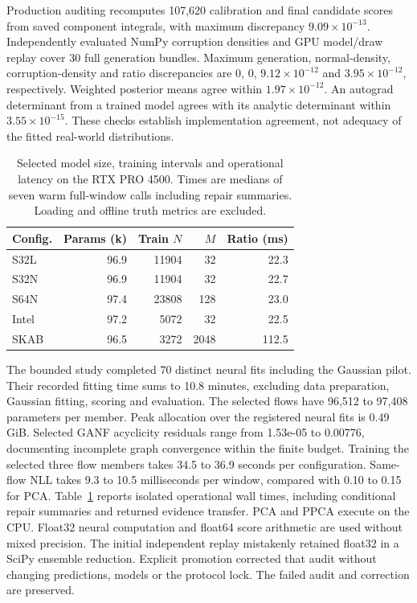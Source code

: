 \documentclass[conference]{IEEEtran}
\newcommand{\1}{\mathbf{1}}
\newcommand{\AuditCandidates}{107,620}
\newcommand{\AuditMaximum}{$9.09\times10^{-13}$}
\newcommand{\ReplayDensity}{0}
\newcommand{\ReplayGeneration}{0}
\newcommand{\ReplayCorruption}{$9.12\times10^{-12}$}
\newcommand{\ReplayRatio}{$3.95\times10^{-12}$}
\newcommand{\ReplayPosterior}{$1.97\times10^{-12}$}
\newcommand{\ReplayJacobian}{$3.55\times10^{-15}$}
\newcommand{\ReplayBundles}{30}
\begin{document}
Production auditing recomputes \AuditCandidates{} calibration and final candidate scores from saved component integrals, with maximum discrepancy \AuditMaximum. Independently evaluated NumPy corruption densities and GPU model/draw replay cover \ReplayBundles{} full generation bundles. Maximum generation, normal-density, corruption-density and ratio discrepancies are \ReplayGeneration, \ReplayDensity, \ReplayCorruption{} and \ReplayRatio, respectively. Weighted posterior means agree within \ReplayPosterior. An autograd determinant from a trained model agrees with its analytic determinant within \ReplayJacobian. These checks establish implementation agreement, not adequacy of the fitted real-world distributions.

\begin{table}[t]
\centering
\caption{Selected model size, training intervals and operational latency on the RTX PRO 4500. Times are medians of seven warm full-window calls including repair summaries. Loading and offline truth metrics are excluded.}
\label{tab:runtime}
\small
\begin{tabular}{lrrrr}
\toprule
Config. & Params (k) & Train $N$ & $M$ & Ratio (ms) \\
\midrule
S32L & 96.9 & 11904 & 32 & 22.3 \\
S32N & 96.9 & 11904 & 32 & 22.7 \\
S64N & 97.4 & 23808 & 128 & 23.0 \\
Intel & 97.2 & 5072 & 32 & 22.5 \\
SKAB & 96.5 & 3272 & 2048 & 112.5 \\
\bottomrule
\end{tabular}
\end{table}
The bounded study completed 70 distinct neural fits including the Gaussian pilot. Their recorded fitting time sums to 10.8 minutes, excluding data preparation, Gaussian fitting, scoring and evaluation. The selected flows have 96,512 to 97,408 parameters per member. Peak allocation over the registered neural fits is 0.49 GiB. Selected GANF acyclicity residuals range from 1.53e-05 to 0.00776, documenting incomplete graph convergence within the finite budget. Training the selected three flow members takes 34.5 to 36.9 seconds per configuration. Same-flow NLL takes 9.3 to 10.5 milliseconds per window, compared with 0.10 to 0.15 for PCA. Table~\ref{tab:runtime} reports isolated operational wall times, including conditional repair summaries and returned evidence transfer. PCA and PPCA execute on the CPU. Float32 neural computation and float64 score arithmetic are used without mixed precision. The initial independent replay mistakenly retained float32 in a SciPy ensemble reduction. Explicit promotion corrected that audit without changing predictions, models or the protocol lock. The failed audit and correction are preserved.
\end{document}

